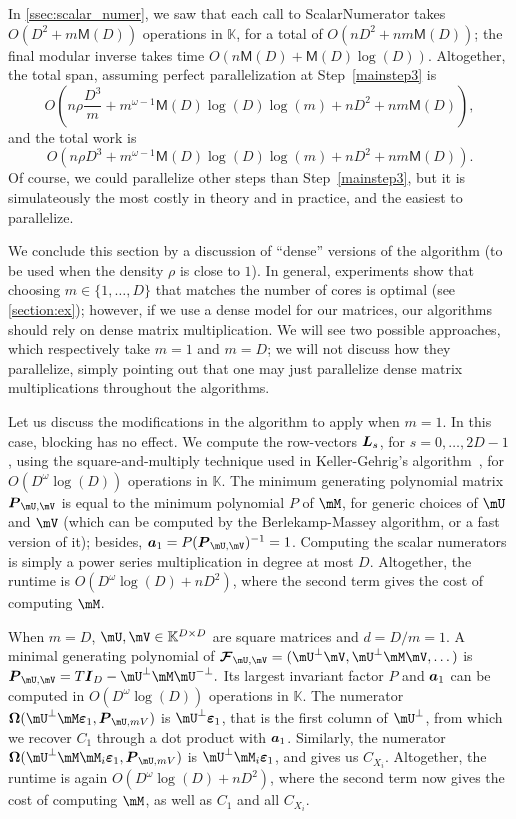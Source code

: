 \documentclass[12pt]{article}
\newcommand{\mat}[1]{\bm{\MakeUppercase{#1}}} %
\newcommand{\row}[1]{\bm{\MakeLowercase{#1}}} %
\newcommand{\col}[1]{\bm{\MakeLowercase{#1}}} %
\newcommand{\seq}{\mat{\mathcal{F}}} %
\newcommand{\minpoly}{P}
\newcommand{\density}{\rho}
\def\M {\ensuremath{\mathsf{M}}}
\def\K{\mathbb{K}}
\def\K {\ensuremath{\mathbb{K}}}
\begin{document}
In \cref{ssec:scalar_numer}, we saw that each call to {\sf ScalarNumerator}
takes $O(D^2 + m\M(D))$ operations in $\K$, for a total of $O(nD^2 + n
m\M(D))$; the final modular inverse takes time $O(n\M(D) + \M(D) \log(D))$.
Altogether, the total span, assuming perfect parallelization 
at Step~\ref{mainstep3} is
$$O\left (n\density \frac{D^3}m + m^{\omega-1} \M(D) \log(D) \log(m) + nD^2 + nm\M(D)\right ),$$
and the total work is
$$O\left (n\density D^3 + m^{\omega-1} \M(D) \log(D) \log(m) + nD^2 +
nm\M(D)\right ).$$ Of course, we could parallelize other steps than
Step~\ref{mainstep3}, but it is simulateously the most costly in
theory and in practice, and the easiest to parallelize. 

\medskip

We conclude this section by a discussion of ``dense'' versions of the
algorithm (to be used when the density $\density$ is close to $1$). In
general, experiments show that choosing $m \in\{1,\dots, D\}$ that
matches the number of cores is optimal (see \cref{section:ex});
however, if we use a dense model for our matrices, our algorithms
should rely on dense matrix multiplication. We will see two possible
approaches, which respectively take $m=1$ and $m=D$; we will not
discuss how they parallelize, simply pointing out that one may just
parallelize dense matrix multiplications throughout the algorithms.

Let us discuss the modifications in the algorithm to apply when
$m=1$. In this case, blocking has no effect. We compute the
row-vectors $\mat{L}_s$, for $s=0,\dots,2D-1$, using the
square-and-multiply technique used in Keller-Gehrig's
algorithm~\cite{Keller85}, for $O(D^\omega \log(D))$ operations in
$\K$. The minimum generating polynomial matrix $\mat{P}_{\mU,\mV}$ is
equal to the minimum polynomial $\minpoly$ of $\mM$, for generic
choices of $\mU$ and $\mV$ (which can be computed by the
Berlekamp-Massey algorithm, or a fast version of it); besides,
$\row{a}_1 = P (\mat{P}_{\mU,\mV})^{-1} = 1$. Computing the scalar
numerators is simply a power series multiplication in degree at most
$D$. Altogether, the runtime is $O(D^{\omega} \log(D) + nD^2)$, 
where the second term gives the cost of computing $\mM$.


When $m = D$, $\mU,\mV \in \mathbb{K}^{D \times D}$ are square
matrices and $d = D/m = 1$. A minimal generating polynomial of
$\seq_{\mU,\mV} = (\mU^\perp\mV, \mU^\perp\mM\mV,\dots)$ is
$\mat{P}_{\mU,\mV} = T \mat{I}_D - \mU^\perp\mM\mU^{-\perp}.$ Its
largest invariant factor $\minpoly$ and $\row{a}_1$ can be computed in
$O(D^\omega \log(D))$ operations in $\K$.  The numerator
$\mat{\Omega}(\mU^\perp \mM \col{\varepsilon}_1, \mat{P}_{\mU,mV})$ is
$\mU^\perp \col{\varepsilon}_1$, that is the first column of
$\mU^\perp$, from which we recover $C_1$ through a dot product with
$\row{a}_1$. Similarly, the numerator $\mat{\Omega}(\mU^\perp \mM
\mM_i \col{\varepsilon}_1, \mat{P}_{\mU,mV})$ is $\mU^\perp \mM_i
\col{\varepsilon}_1$, and gives us $C_{X_i}$. Altogether, 
the runtime is again  $O(D^{\omega} \log(D) + nD^2)$, 
where the second term now gives the cost of computing $\mM$,
as well as $C_1$ and all $C_{X_i}$.
\end{document}
